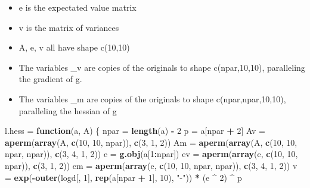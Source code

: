 \documentclass[]{article}
\newenvironment{Shaded}{\begin{snugshade}}{\end{snugshade}}
\newcommand{\ControlFlowTok}[1]{\textcolor[rgb]{0.13,0.29,0.53}{\textbf{#1}}}
\newcommand{\DecValTok}[1]{\textcolor[rgb]{0.00,0.00,0.81}{#1}}
\newcommand{\KeywordTok}[1]{\textcolor[rgb]{0.13,0.29,0.53}{\textbf{#1}}}
\newcommand{\NormalTok}[1]{#1}
\newcommand{\OperatorTok}[1]{\textcolor[rgb]{0.81,0.36,0.00}{\textbf{#1}}}
\newcommand{\StringTok}[1]{\textcolor[rgb]{0.31,0.60,0.02}{#1}}
\providecommand{\tightlist}{%
  \setlength{\itemsep}{0pt}\setlength{\parskip}{0pt}}
\begin{document}
\begin{itemize}
\tightlist
\item
  e is the expectated value matrix
\item
  v is the matrix of variances
\item
  A, e, v all have shape c(10,10)
\item
  The variables \_v are copies of the originals to shape c(npar,10,10),
  paralleling the gradient of g.
\item
  The variables \_m are copies of the originals to shape
  c(npar,npar,10,10), paralleling the hessian of g
\end{itemize}

\begin{Shaded}
\begin{Highlighting}[]
\NormalTok{l.hess =}\StringTok{ }\ControlFlowTok{function}\NormalTok{(a, A) \{}
\NormalTok{  npar =}\StringTok{ }\KeywordTok{length}\NormalTok{(a) }\OperatorTok{-}\StringTok{ }\DecValTok{2}
\NormalTok{  p =}\StringTok{ }\NormalTok{a[npar }\OperatorTok{+}\StringTok{ }\DecValTok{2}\NormalTok{]}
\NormalTok{  Av =}\StringTok{ }\KeywordTok{aperm}\NormalTok{(}\KeywordTok{array}\NormalTok{(A, }\KeywordTok{c}\NormalTok{(}\DecValTok{10}\NormalTok{, }\DecValTok{10}\NormalTok{, npar)), }\KeywordTok{c}\NormalTok{(}\DecValTok{3}\NormalTok{, }\DecValTok{1}\NormalTok{, }\DecValTok{2}\NormalTok{))}
\NormalTok{  Am =}\StringTok{ }\KeywordTok{aperm}\NormalTok{(}\KeywordTok{array}\NormalTok{(A, }\KeywordTok{c}\NormalTok{(}\DecValTok{10}\NormalTok{, }\DecValTok{10}\NormalTok{, npar, npar)), }\KeywordTok{c}\NormalTok{(}\DecValTok{3}\NormalTok{, }\DecValTok{4}\NormalTok{, }\DecValTok{1}\NormalTok{, }\DecValTok{2}\NormalTok{))}
\NormalTok{  e =}\StringTok{ }\KeywordTok{g.obj}\NormalTok{(a[}\DecValTok{1}\OperatorTok{:}\NormalTok{npar])}
\NormalTok{  ev =}\StringTok{ }\KeywordTok{aperm}\NormalTok{(}\KeywordTok{array}\NormalTok{(e, }\KeywordTok{c}\NormalTok{(}\DecValTok{10}\NormalTok{, }\DecValTok{10}\NormalTok{, npar)), }\KeywordTok{c}\NormalTok{(}\DecValTok{3}\NormalTok{, }\DecValTok{1}\NormalTok{, }\DecValTok{2}\NormalTok{))}
\NormalTok{  em =}\StringTok{ }\KeywordTok{aperm}\NormalTok{(}\KeywordTok{array}\NormalTok{(e, }\KeywordTok{c}\NormalTok{(}\DecValTok{10}\NormalTok{, }\DecValTok{10}\NormalTok{, npar, npar)), }\KeywordTok{c}\NormalTok{(}\DecValTok{3}\NormalTok{, }\DecValTok{4}\NormalTok{, }\DecValTok{1}\NormalTok{, }\DecValTok{2}\NormalTok{))}
\NormalTok{  v =}\StringTok{ }\KeywordTok{exp}\NormalTok{(}\OperatorTok{-}\KeywordTok{outer}\NormalTok{(logd[, }\DecValTok{1}\NormalTok{], }\KeywordTok{rep}\NormalTok{(a[npar }\OperatorTok{+}\StringTok{ }\DecValTok{1}\NormalTok{], }\DecValTok{10}\NormalTok{), }\StringTok{"-"}\NormalTok{)) }\OperatorTok{*}\StringTok{ }\NormalTok{(e }\OperatorTok{^}\StringTok{ }\DecValTok{2}\NormalTok{) }\OperatorTok{^}\StringTok{ }\NormalTok{p}

\end{Highlighting}
\end{Shaded}
\end{document}
